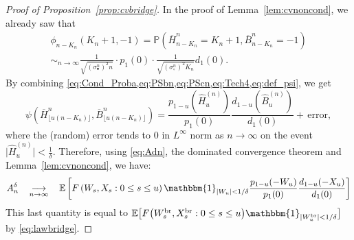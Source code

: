 \documentclass[10pt]{amsart}
\theoremstyle{definition}\newtheorem{defi}[theo]{Definition}\newtheorem{rema}[theo]{Remark}\newtheorem{exam}[theo]{Example}\newtheorem{exem}[theo]{Example}\newtheorem{nota}[theo]{Notation}
\def\scn{\sigma_{\circ}^{n}}
\def\sbn{\sigma_{\bullet}^{n}}
\def\oB{\overline{B}}
\def\hB{\widehat{B}}
\def\oH{\overline{H}}
\def\hH{\widehat{H}}
\newcommand\Es[1]{\mathbb{E}\left[#1\right]}
\newcommand\Esb[1]{\mathbb{E}\big[#1\big]}
\renewcommand\Pr[1]{\mathbb{P}\left(#1\right)}
\begin{document}
\begin{proof}[Proof of Proposition~\ref{prop:cvbridge}]
In the proof of Lemma~\ref{lem:cvnoncond}, we already saw that
\begin{multline}
  \phi_{n-K_{n}} (K_{n}+1,-1) =\Pr{\oH^{n}_{n-K_{n}}=K_{n}+1, \oB^{n}_{n-K_{n}}=-1} \\
  \mathop{\sim}_{n \rightarrow \infty}   \frac{1}{ \sqrt{ (\sbn)^{2} n}  } \cdot   p_{1}  (0) \cdot  \frac{1}{\sqrt{ (\scn)^{2} K_{n}}} d_{1}(0).
  \label{eq:Cond_Proba}
\end{multline}
By combining \cref{eq:Cond_Proba,eq:PSbn,eq:PScn,eq:Tech4,eq:def_psi}, we get
\begin{equation}
   \psi \left( \oH^{n}_{ \lfloor u (n-K_{n}) \rfloor },\oB^{n}_{ \lfloor u (n-K_{n}) \rfloor }\right)
=  \frac{p_{1-u}(\hH^{(n)}_{u})}{p_{1}(0)} \frac{d_{1-u}(\hB^{(n)}_{u})}{d_{1}(0)} +\, \text{error},
\label{eq:limit_psi}
\end{equation}
where the (random) error tends to $0$ in $L^\infty$ norm as $n \to \infty$ on the event $ \big| \hH^{(n)}_{u} \big| < \tfrac{1}{\delta}$.
Therefore, using \eqref{eq:Adn}, the dominated convergence theorem and Lemma~\ref{lem:cvnoncond}, we have:
\begin{equation}
\label{eq:cvu0}A^{\delta}_{n}  \quad \mathop{\longrightarrow}_{n \rightarrow \infty} \quad  \Es{F \left(   W_{s},X_{s} : 0 \leq s \leq u \right)  \mathbbm{1}_{|W_{u}|<1/\delta} \frac{p_{1-u}(-W_{u})}{p_{1}(0)} \frac{d_{1-u}(-X_{u})}{d_{1}(0)} }
\end{equation}
This last quantity is equal to $\Esb{F \big(  W^{\textrm{br}}_{s},X^{\textrm{br}}_{s} : 0 \leq s \leq u \big)  \mathbbm{1}_{|W^{\textrm{br}}_{u}|<1/\delta}}$ by \eqref{eq:lawbridge}.



\end{proof}
\end{document}
